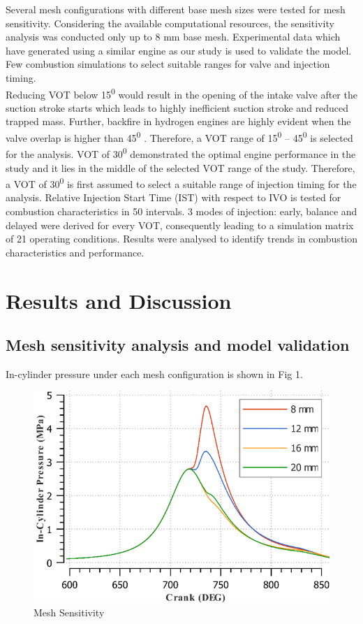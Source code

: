 \documentclass[conference]{IEEEtran}
\begin{document}
Several mesh configurations with different base mesh sizes were tested for mesh sensitivity.
Considering the available computational resources, the sensitivity analysis was conducted only up to 8 mm base mesh.
Experimental data which have generated using a similar engine as our study \cite{b10} is used to validate the model.
Few combustion simulations to select suitable ranges for valve and injection timing.\\

Reducing VOT below 15\textsuperscript{0} would result in the opening of the intake valve after the suction stroke starts which leads to highly inefficient suction stroke and reduced trapped mass.
Further, backfire in hydrogen engines are highly evident when the valve overlap is higher than 45\textsuperscript{0} \cite{b7,b10}.
Therefore, a VOT range of 15\textsuperscript{0} – 45\textsuperscript{0} is selected for the analysis.
VOT of 30\textsuperscript{0} demonstrated the optimal engine performance in the study \cite{b7} and it lies in the middle of the selected VOT range of the study.
Therefore, a VOT of 30\textsuperscript{0} is first assumed to select a suitable range of injection timing for the analysis.
Relative Injection Start Time (IST) with respect to IVO is tested for combustion characteristics in 50 intervals.
3 modes of injection: early, balance and delayed were derived for every VOT, consequently leading to a simulation matrix of 21 operating conditions.
Results were analysed to identify trends in combustion characteristics and performance.

\section{Results and Discussion}
\subsection{Mesh sensitivity analysis and model validation}
In-cylinder pressure under each mesh configuration is shown in Fig 1.

\begin{figure}[htbp]
    \centerline{\includegraphics{plots and graphs/1.png}}
    \caption{Mesh Sensitivity}
    \label{plt_1}
    \end{figure}
\end{document}
